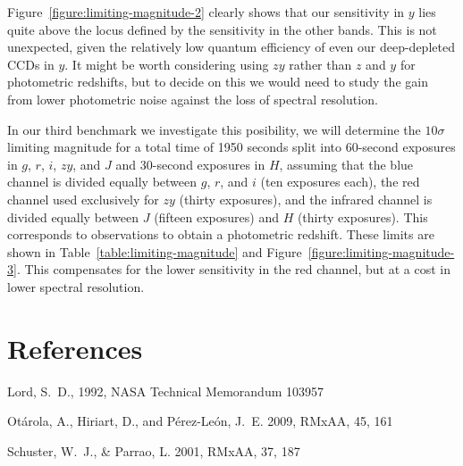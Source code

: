 \documentclass{article}
\begin{document}
Figure~\ref{figure:limiting-magnitude-2} clearly shows that our sensitivity in $y$ lies quite above the locus defined by the sensitivity in the other bands. This is not unexpected, given the relatively low quantum efficiency of even our deep-depleted CCDs in $y$. It might be worth considering using $zy$ rather than $z$ and $y$ for photometric redshifts, but to decide on this we would need to study the gain from lower photometric noise against the loss of spectral resolution.

In our third benchmark we investigate this posibility, we will determine the $10\sigma$ limiting magnitude for a total time of
1950 seconds split into 60-second exposures in $g$, $r$, $i$, $zy$, and $J$ and 30-second exposures in $H$, assuming that the blue channel is divided equally between $g$, $r$, and $i$ (ten exposures each), the red channel used exclusively for $zy$ (thirty exposures), and the infrared channel is divided equally between $J$  (fifteen exposures) and $H$ (thirty exposures). This corresponds to observations to obtain a photometric redshift. These limits are shown in Table~\ref{table:limiting-magnitude} and Figure~\ref{figure:limiting-magnitude-3}. This compensates for the lower sensitivity in the red channel, but at a cost in lower spectral resolution.

\section*{References}

Lord, S.~D., 1992, NASA Technical Memorandum 103957

Otárola, A., Hiriart, D., and Pérez-León, J.~E. 2009, RMxAA, 45, 161

Schuster, W.~J., \& Parrao, L. 2001, RMxAA, 37, 187
\end{document}
